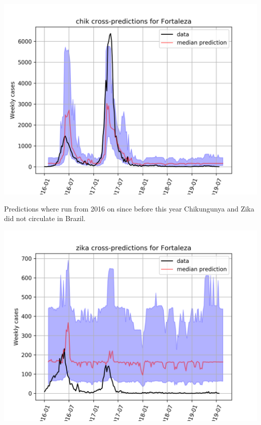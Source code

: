 \documentclass[a0,portrait]{a0poster}
\begin{document}
\begin{multicols}{3}
\begin{center}\vspace{1cm}
\includegraphics[width=0.9\linewidth]{figures/qf_chik_cross_Fortaleza.png} 
\label{fig:chik_fortaleza}
\end{center}%

Predictions where run from 2016 on since before this year Chikungunya and Zika 
did not circulate in Brazil. 

\begin{center}\vspace{1cm}
\includegraphics[width=1\linewidth]{figures/qf_zika_cross_Fortaleza}
\label{fig:zika_fortaleza}
\end{center}%


\end{multicols}
\end{document}
